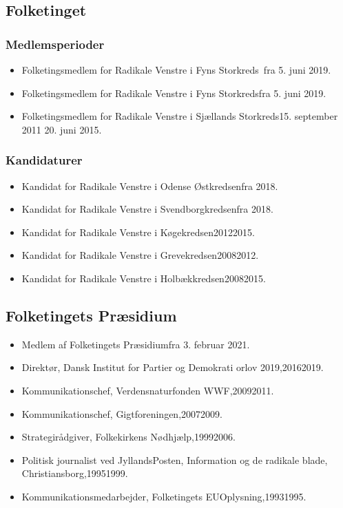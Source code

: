 \documentclass[11pt, a4paper]{awesome-cv}
\begin{document}
\begin{cvletter}
\subsection*{Folketinget}
\subsubsection*{Medlemsperioder}
\begin{itemize}
\item Folketingsmedlem for Radikale Venstre i Fyns Storkreds fra 5. juni 2019.
\item Folketingsmedlem for Radikale Venstre i Fyns Storkredsfra 5. juni 2019.
\item Folketingsmedlem for Radikale Venstre i Sjællands Storkreds15. september 2011  20. juni 2015.
\end{itemize}
\subsubsection*{Kandidaturer}
\begin{itemize}
\item Kandidat for Radikale Venstre i Odense Østkredsenfra 2018.
\item Kandidat for Radikale Venstre i Svendborgkredsenfra 2018.
\item Kandidat for Radikale Venstre i Køgekredsen20122015.
\item Kandidat for Radikale Venstre i Grevekredsen20082012.
\item Kandidat for Radikale Venstre i Holbækkredsen20082015.
\end{itemize}
\subsection*{Folketingets Præsidium}
\begin{itemize}
\item Medlem af Folketingets Præsidiumfra 3. februar 2021.
\end{itemize}
\begin{itemize}
\item Direktør, Dansk Institut for Partier og Demokrati orlov 2019,20162019.
\item Kommunikationschef, Verdensnaturfonden WWF,20092011.
\item Kommunikationschef, Gigtforeningen,20072009.
\item Strategirådgiver, Folkekirkens Nødhjælp,19992006.
\item Politisk journalist ved JyllandsPosten, Information og de radikale blade, Christiansborg,19951999.
\item Kommunikationsmedarbejder, Folketingets EUOplysning,19931995.
\end{itemize}
\end{cvletter}
\end{document}
